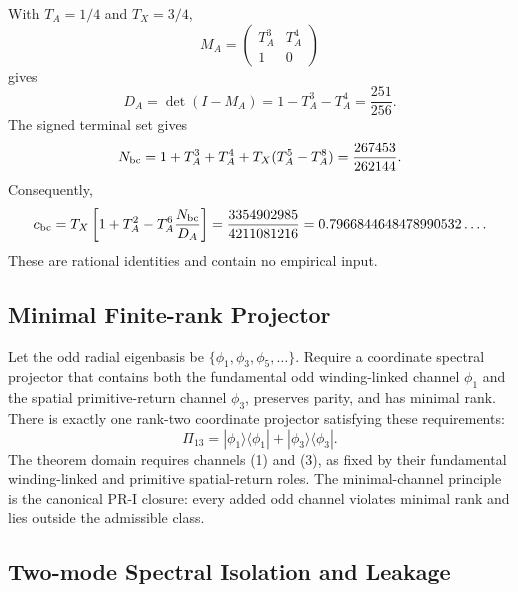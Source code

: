 With $T_A=1/4$ and $T_X=3/4$,
\begin{equation}
M_A
=
\begin{pmatrix}
T_A^3&T_A^4\\
1&0
\end{pmatrix}
\end{equation}
gives
\begin{equation}
D_A
=
\det(I-M_A)
=
1-T_A^3-T_A^4
=
\frac{251}{256}.
\label{eq:pr35-da-exact}
\end{equation}
The signed terminal set gives
\begin{equation}
N_{\rm bc}
=
1+T_A^3+T_A^4+T_X(T_A^5-T_A^8)
=
\frac{267453}{262144}.
\label{eq:pr35-nbc-exact}
\end{equation}
Consequently,
\begin{equation}
c_{\rm bc}
=
T_X\left[1+T_A^2-T_A^6\frac{N_{\rm bc}}{D_A}\right]
=
\frac{3354902985}{4211081216}
=
0.7966844648478990532\ldots .
\label{eq:pr35-cbc-exact}
\end{equation}
These are rational identities and contain no empirical input.

\subsection{Minimal Finite-rank Projector}
\label{subsec:pr35-pi13-uniqueness}

Let the odd radial eigenbasis be
\(\{\phi_1,\phi_3,\phi_5,\ldots\}\).  Require a coordinate spectral
projector that contains both the fundamental odd winding-linked channel
\(\phi_1\) and the spatial primitive-return channel \(\phi_3\), preserves
parity, and has minimal rank.  There is exactly one rank-two coordinate
projector satisfying these requirements:
\begin{equation}
\boxed{
\Pi_{13}
=
|\phi_1\rangle\langle\phi_1|
+
|\phi_3\rangle\langle\phi_3|.}
\label{eq:pr35-pi13-unique}
\end{equation}
The theorem domain requires channels (1) and (3), as fixed by their
fundamental winding-linked and primitive spatial-return roles.  The
minimal-channel principle is the canonical PR-I closure: every added odd
channel violates minimal rank and lies outside the admissible class.

\subsection{Two-mode Spectral Isolation and Leakage}
\label{subsec:pr35-two-mode-leakage}

